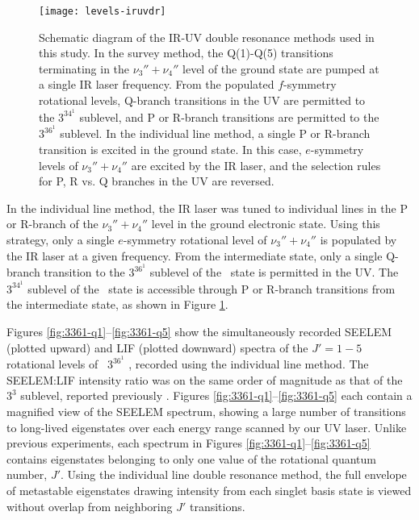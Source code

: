 \begin{figure}
  \centering
  
  \texttt{[image: levels-iruvdr]}

  \caption{Schematic diagram of the IR-UV double resonance methods
    used in this study.  In the survey method, the Q(1)-Q(5)
    transitions terminating in the $\nu_3''+\nu_4''$ level of the
    ground state are pumped at a single IR laser frequency.  From the
    populated $f$-symmetry rotational levels, Q-branch transitions in
    the UV are permitted to the $3^34^1$  sublevel, and P or
    R-branch transitions are permitted to the $3^36^1$ 
    sublevel.  In the individual line method, a single P or R-branch
    transition is excited in the ground state.  In this case,
    $e$-symmetry levels of $\nu_3''+\nu_4''$ are excited by the IR
    laser, and the selection rules for P, R vs. Q branches in the UV
    are reversed.}
  \label{fig:levels-iruvdr}
\end{figure}

In the individual line method, the IR laser was tuned to individual
lines in the P or R-branch of the $\nu_3''+\nu_4''$ level in the
ground electronic state.  Using this strategy, only a single
$e$-symmetry rotational level of $\nu_3''+\nu_4''$ is populated by the
IR laser at a given frequency.  From the intermediate state, only a
single Q-branch transition to the $3^36^1$  sublevel of the
\astate\ state is permitted in the UV.  The $3^34^1$  sublevel
of the \astate\ state is accessible through P or R-branch transitions
from the intermediate state, as shown in Figure
\ref{fig:levels-iruvdr}.


Figures \ref{fig:3361-q1}--\ref{fig:3361-q5} show the simultaneously
recorded SEELEM (plotted upward) and LIF (plotted downward) spectra of
the $J'=1-5$ rotational levels of \astate\ $3^36^1$ , recorded
using the individual line method.  The SEELEM:LIF intensity ratio was on
the same order of magnitude as that of the $3^3$  sublevel,
reported previously \cite{mishra04}. Figures
\ref{fig:3361-q1}--\ref{fig:3361-q5} each contain a magnified view of
the SEELEM spectrum, showing a large number of transitions to
long-lived eigenstates over each energy range scanned by our UV laser.
Unlike previous experiments, each spectrum in Figures
\ref{fig:3361-q1}--\ref{fig:3361-q5} contains eigenstates belonging to only
one value of the rotational quantum number, $J'$.  Using the individual line
double resonance method, the full envelope of metastable eigenstates
drawing intensity from each singlet basis state is viewed without
overlap from neighboring $J'$ transitions.

